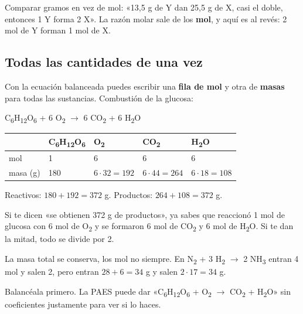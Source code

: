 \begin{ojo} Comparar gramos en vez de mol: «13,5 g de Y dan 25,5 g de X, casi el doble, entonces 1 Y forma 2 X». La razón molar sale de los \textbf{mol}, y aquí es al revés: 2 mol de Y forman 1 mol de X.\end{ojo}
\subsection{Todas las cantidades de una vez}
Con la ecuación balanceada puedes escribir una \textbf{fila de mol} y otra de \textbf{masas} para todas las sustancias. Combustión de la glucosa:

 
\begin{center}
C\textsubscript{6}H\textsubscript{12}O\textsubscript{6} + 6 O\textsubscript{2} \ensuremath{\rightarrow} 6 CO\textsubscript{2} + 6 H\textsubscript{2}O
\end{center}
 
\begin{center}\small
\begin{tabular}{@{}lllll@{}}
\toprule
 & \textbf{C\textsubscript{6}H\textsubscript{12}O\textsubscript{6}} & \textbf{O\textsubscript{2}} & \textbf{CO\textsubscript{2}} & \textbf{H\textsubscript{2}O} \\
\midrule
mol & 1 & 6 & 6 & 6 \\
masa (g) & 180 & $6\cdot 32 = 192$ & $6\cdot 44 = 264$ & $6\cdot 18 = 108$ \\
\bottomrule
\end{tabular}
\end{center}
 

Reactivos: $180 + 192 = 372$ g. Productos: $264 + 108 = 372$ g. 

  
\begin{clave} Si te dicen «se obtienen 372 g de productos», ya sabes que reaccionó 1 mol de glucosa con 6 mol de O\textsubscript{2} y se formaron 6 mol de CO\textsubscript{2} y 6 mol de H\textsubscript{2}O. Si te dan la mitad, todo se divide por 2.\end{clave}
 
\begin{ojo}[{Ojo}] La masa total se conserva, los mol no siempre. En N\textsubscript{2} + 3 H\textsubscript{2} \ensuremath{\rightarrow} 2 NH\textsubscript{3} entran 4 mol y salen 2, pero entran $28 + 6 = 34$ g y salen $2\cdot 17 = 34$ g.\end{ojo}
 
\begin{ojo} Balancéala primero. La PAES puede dar «C\textsubscript{6}H\textsubscript{12}O\textsubscript{6} + O\textsubscript{2} \ensuremath{\rightarrow} CO\textsubscript{2} + H\textsubscript{2}O» sin coeficientes justamente para ver si lo haces.\end{ojo}
